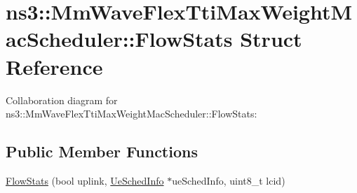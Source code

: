 \hypertarget{structns3_1_1MmWaveFlexTtiMaxWeightMacScheduler_1_1FlowStats}{}\section{ns3\+:\+:Mm\+Wave\+Flex\+Tti\+Max\+Weight\+Mac\+Scheduler\+:\+:Flow\+Stats Struct Reference}
\label{structns3_1_1MmWaveFlexTtiMaxWeightMacScheduler_1_1FlowStats}


Collaboration diagram for ns3\+:\+:Mm\+Wave\+Flex\+Tti\+Max\+Weight\+Mac\+Scheduler\+:\+:Flow\+Stats\+:
\subsection*{Public Member Functions}
\begin{DoxyCompactItemize}
\item 
\hyperlink{structns3_1_1MmWaveFlexTtiMaxWeightMacScheduler_1_1FlowStats_ad1f2d9dae857d59aaab761efcc6378be}{Flow\+Stats} (bool uplink, \hyperlink{structns3_1_1MmWaveFlexTtiMaxWeightMacScheduler_1_1UeSchedInfo}{Ue\+Sched\+Info} $\ast$ue\+Sched\+Info, uint8\+\_\+t lcid)
\end{DoxyCompactItemize}
